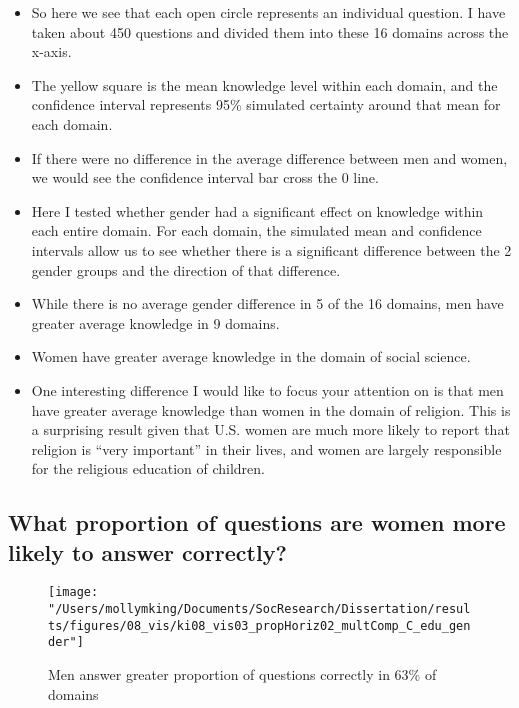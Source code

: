 \documentclass[]{article}
\begin{document}
\begin{itemize}
  \item{So here we see that each open circle represents an individual question. I have taken about 450 questions and divided them into these 16 domains across the x-axis.}
  \item{The yellow square is the mean knowledge level within each domain, and the confidence interval represents 95\% simulated certainty around that mean for each domain.}
  \item{If there were no difference in the average difference between men and women, we would see the confidence interval bar cross the 0 line.}
  \item{Here I tested whether gender had a significant effect on knowledge within each entire domain. For each domain, the simulated mean and confidence intervals allow us to see whether there is a significant difference between the 2 gender groups and the direction of that difference.}
  \item{While there is no average gender difference in 5 of the 16 domains, men have greater average knowledge in 9 domains.}
  \item{Women have greater average knowledge in the domain of social science.}
  \item{One interesting difference I would like to focus your attention on is that men have greater average knowledge than women in the domain of religion. This is a surprising result given that U.S. women are much more likely to report that religion is ``very important'' in their lives, and women are largely responsible for the religious education of children.}
\end{itemize}

\newpage
\subsection{What proportion of questions are women more likely to answer correctly?}
\begin{figure}[ht]
    \begin{center}
      \texttt{[image: "/Users/mollymking/Documents/SocResearch/Dissertation/results/figures/08\_vis/ki08\_vis03\_propHoriz02\_multComp\_C\_edu\_gender"]}
      \caption{Men answer greater proportion of questions correctly in 63\% of domains}
    \end{center}
\end{figure}
\end{document}
